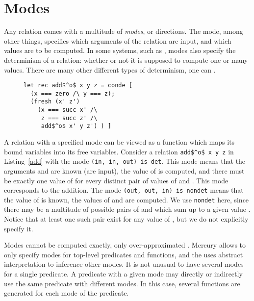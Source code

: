 \section{Modes}


Any relation comes with a multitude of \emph{modes}, or directions.
The mode, among other things, specifies which arguments of the relation are input, and which values are to be computed.
In some systems, such as \mercury, modes also specify the determinism of a relation: whether or not it is supposed to compute one or many values.
There are many other different types of determinism, one can .

\begin{figure}[!t]
  \centering
  \begin{minipage}{0.28\textwidth}
    \begin{lstlisting}[label={add}, caption={Addition relation}, captionpos=b, frame=tb]
let rec add$^o$ x y z = conde [
  (x === zero /\ y === z);
  (fresh (x' z')
    (x === succ x' /\
     z === succ z' /\
     add$^o$ x' y z') ) ]
    \end{lstlisting}
  \end{minipage}
\end{figure}

A relation with a specified mode can be viewed as a function which maps its bound variables into its free variables.
Consider a relation \lstinline{add$^o$ x y z} in Listing~\ref{add} with the mode \lstinline{(in, in, out) is det}.
This mode means that the arguments \x and \y are known (are input), the value of \z is computed, and there must be exactly one value of \z for every distinct pair of values of \x and \y.
This mode corresponds to the addition.
The mode \lstinline{(out, out, in) is nondet} means that the value of \z is known, the values of \x and \y are computed.
We use \lstinline{nondet} here, since there may be a multitude of possible pairs of \x and \y which sum up to a given value \z.
Notice that at least one such pair exist for any value of \z, but we do not explicitly specify it.

Modes cannot be computed exactly, only over-approximated .
Mercury allows to only specify modes for top-level predicates and functions, and the uses abstract interpretation to inference other modes.
It is not unusual to have several modes for a single predicate.
A predicate with a given mode may directly or indirectly use the same predicate with different modes.
In this case, several functions are generated for each mode of the predicate.

